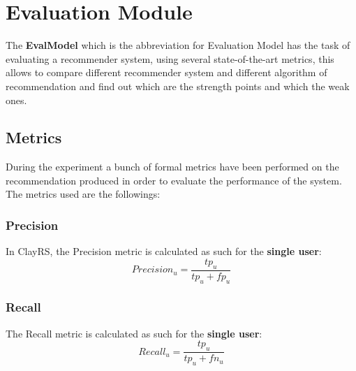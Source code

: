 

\section{Evaluation Module}\label{sec:eva-module}
The \textbf{EvalModel} which is the abbreviation for Evaluation Model has the task of evaluating a recommender system,
using several state-of-the-art metrics, this allows to compare different recommender system and different algorithm of
recommendation and find out which are the strength points and which the weak ones.

\subsection{Metrics}\label{subsec:metrics}
During the experiment a bunch of formal metrics have been performed on the recommendation produced in order to evaluate
the performance of the system.
The metrics used are the followings:
\hfill\break
\hfill\break

\subsubsection{Precision}\label{subsubsec:precision}
In ClayRS, the Precision metric is calculated as such for the \textbf{single user}:
\hfill\break
\hfill\break
    \[
         Precision_u = \frac{tp_u}{tp_u + fp_u}
    \]


\subsubsection{Recall}\label{subsubsec:recall}
The Recall metric is calculated as such for the \textbf{single user}:
\hfill\break
\hfill\break
    \[
        Recall_u = \frac{tp_u}{tp_u + fn_u}
    \]


